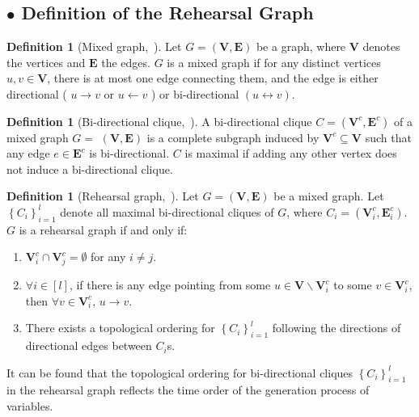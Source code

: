 \documentclass{article}
\theoremstyle{plain}
\theoremstyle{definition}
\newtheorem{definition}[theorem]{Definition}
\theoremstyle{remark}
\def \E {\mathbf{E}}
\def \V {\mathbf{V}}
\def \V {\mathbf{V}}
\begin{document}
\subsection*{$\bullet$ Definition of the Rehearsal Graph}
\begin{definition}[Mixed graph,~\cite{qint2023srm}]
  \label{def:mixed_graph} Let $G=(\V, \E)$ be a graph, where $\V$ denotes the vertices and $\E$ the edges. $G$ is a mixed graph if for any distinct vertices $u, v \in \V$, there is at most one edge connecting them, and the edge is either directional ( $u \rightarrow v$ or $u \leftarrow v$ ) or bi-directional $(u \leftrightarrow v)$.
\end{definition}

\begin{definition}[Bi-directional clique,~\cite{qint2023srm}]
  \label{def:bi_clique}
  A bi-directional clique $C=\left(\V^c, \E^c\right)$ of a mixed graph $G=$ $(\V, \E)$ is a complete subgraph induced by $\V^c \subseteq \V$ such that any edge $e \in \E^c$ is bi-directional. $C$ is maximal if adding any other vertex does not induce a bi-directional clique.
\end{definition}

\begin{definition}[Rehearsal graph,~\cite{qint2023srm}]
  \label{def:rh_graph}
  Let $G=(\V, \E)$ be a mixed graph. Let $\left\{C_i\right\}_{i=1}^l$ denote all maximal bi-directional cliques of $G$, where $C_i=\left(\V_i^c, \E_i^c\right)$. $G$ is a rehearsal graph if and only if:
  \vspace{-0.3\baselineskip}
  \begin{enumerate}
    \item $\V_i^c \cap \V_j^c=\emptyset$ for any $i \neq j$.
    \vspace{0.2\baselineskip}
    \item $\forall i \in[l]$, if there is any edge pointing from some $u \in \V \backslash \V_i^c$ to some $v \in \V_i^c$, then $\forall v \in \V_i^c$, $u \rightarrow v$.
    \vspace{0.2\baselineskip}
    \item There exists a topological ordering for $\left\{C_i\right\}_{i=1}^l$ following the directions of directional edges between $C_i$s.
  \end{enumerate}
\end{definition}

It can be found that the topological ordering for bi-directional cliques $\left\{C_i\right\}_{i=1}^l$ in the rehearsal graph reflects the time order of the generation process of variables. 
\end{document}
